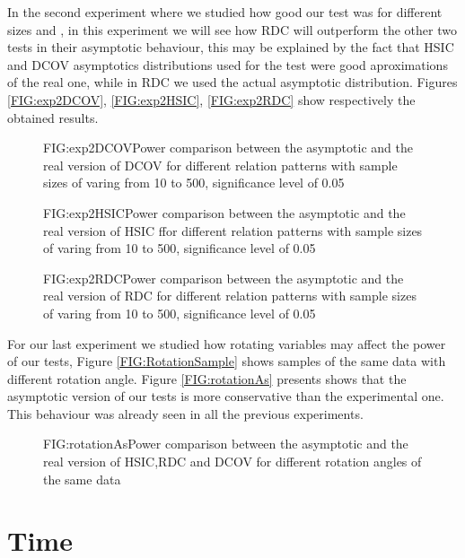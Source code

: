In the second experiment where we studied how good our test was for different sizes and , in this experiment we will see how RDC will outperform the other two tests in their asymptotic behaviour, this may be explained by the fact that HSIC and DCOV asymptotics distributions used for the test were good aproximations of the real one, while in RDC we used the actual asymptotic distribution. Figures \ref{FIG:exp2DCOV}, \ref{FIG:exp2HSIC}, \ref{FIG:exp2RDC} show respectively the obtained results.
\FloatBarrier
\begin{figure}[Experiment 2 DCOV asymptotic vs real]{FIG:exp2DCOV}{Power comparison between the asymptotic and the real version of DCOV for different relation patterns with sample sizes of varing from 10 to 500, significance level of 0.05}
\end{figure}
\begin{figure}[Experiment 2 HSIC asymptotic vs real]{FIG:exp2HSIC}{Power comparison between the asymptotic and the real version of HSIC ffor different relation patterns with sample sizes of varing from 10 to 500, significance level of 0.05}
\end{figure}
\begin{figure}[Experiment 2 RDC asymptotic vs real]{FIG:exp2RDC}{Power comparison between the asymptotic and the real version of RDC for different relation patterns with sample sizes of varing from 10 to 500, significance level of 0.05}
\end{figure}
\FloatBarrier

For our last experiment we studied how rotating variables may affect the power of our tests, Figure \ref{FIG:RotationSample} shows samples of the same data with different rotation angle. Figure \ref{FIG:rotationAs} presents shows that the asymptotic version of our tests is more conservative than the experimental one. This behaviour was already seen in all the previous experiments. 
\FloatBarrier
\begin{figure}[Experiment 3 asymptotic vs experimental]{FIG:rotationAs}{Power comparison between the asymptotic and the real version of HSIC,RDC and DCOV for different rotation angles of the same data}
\end{figure}
\FloatBarrier

\section{Time}

